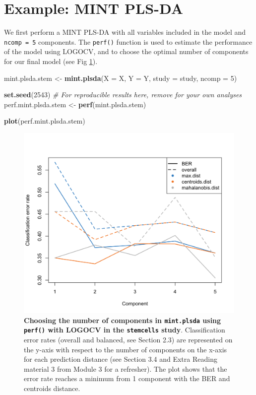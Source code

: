 \documentclass[]{book}
\newenvironment{Shaded}{\begin{snugshade}}{\end{snugshade}}
\newcommand{\KeywordTok}[1]{\textcolor[rgb]{0.13,0.29,0.53}{\textbf{#1}}}
\newcommand{\DataTypeTok}[1]{\textcolor[rgb]{0.13,0.29,0.53}{#1}}
\newcommand{\DecValTok}[1]{\textcolor[rgb]{0.00,0.00,0.81}{#1}}
\newcommand{\StringTok}[1]{\textcolor[rgb]{0.31,0.60,0.02}{#1}}
\newcommand{\CommentTok}[1]{\textcolor[rgb]{0.56,0.35,0.01}{\textit{#1}}}
\newcommand{\NormalTok}[1]{#1}
\begin{document}
\section{Example: MINT PLS-DA}\label{mint:plsda}

We first perform a MINT PLS-DA with all variables included in the model
and \texttt{ncomp\ =\ 5} components. The \texttt{perf()} function is
used to estimate the performance of the model using LOGOCV, and to
choose the optimal number of components for our final model (see Fig
\ref{fig:MINT-perf}).

\begin{Shaded}
\begin{Highlighting}[]
\NormalTok{mint.plsda.stem <-}\StringTok{ }\KeywordTok{mint.plsda}\NormalTok{(}\DataTypeTok{X =}\NormalTok{ X, }\DataTypeTok{Y =}\NormalTok{ Y, }\DataTypeTok{study =}\NormalTok{ study, }\DataTypeTok{ncomp =} \DecValTok{5}\NormalTok{)}

\KeywordTok{set.seed}\NormalTok{(}\DecValTok{2543}\NormalTok{) }\CommentTok{# For reproducible results here, remove for your own analyses}
\NormalTok{perf.mint.plsda.stem <-}\StringTok{ }\KeywordTok{perf}\NormalTok{(mint.plsda.stem) }

\KeywordTok{plot}\NormalTok{(perf.mint.plsda.stem)}
\end{Highlighting}
\end{Shaded}

\begin{figure}

{\centering \includegraphics[width=0.5\linewidth]{Figures/MINT/MINT-perf-1} 

}

\caption{\textbf{Choosing the number of components in
\texttt{mint.plsda} using \texttt{perf()} with LOGOCV in the
\texttt{stemcells} study}. Classification error rates (overall and
balanced, see Section 2.3) are represented on the y-axis with respect to
the number of components on the x-axis for each prediction distance (see
Section 3.4 and Extra Reading material 3 from Module 3 for a refresher).
The plot shows that the error rate reaches a minimum from 1 component
with the BER and centroids distance.}\label{fig:MINT-perf}
\end{figure}
\end{document}

